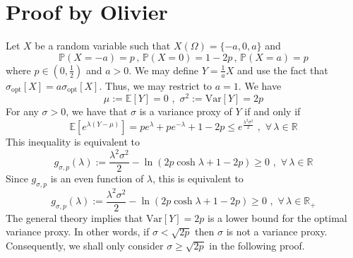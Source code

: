 \documentclass[a4paper, 10pt]{article}
\renewcommand{\P}{\mathbb{P}}
\newcommand{\E}{\mathbb{E}}
\newcommand{\beq}{\begin{equation}}
\newcommand{\eeq}{\end{equation}}
\theoremstyle{definition}
\begin{document}
\section{Proof by Olivier}
Let $X$ be a random variable such that $X(\Omega)=\{-a,0,a\}$ and 
\begin{equation}
    \P(X=-a)=p\,,\, \P(X=0)=1-2p\,,\, \P(X=a)=p
\end{equation}
where $p\in \left( 0,\frac{1}{2}\right)$ and $a>0$. We may define $Y=\frac{1}{a}X$ and use the fact that $\sigma_{\text{opt}}[X]=a \sigma_{\text{opt}}[X]$. Thus, we may restrict to $a=1$. We have
\beq \mu:=\E[Y]=0\,\,,\,\, \sigma^2:=\text{Var}[Y]=2p\eeq
For any $\sigma>0$, we have that $\sigma$ is a variance proxy of $Y$ if and only if
\beq \E\left[e^{\lambda (Y-\mu)}\right]=p e^{\lambda }+ pe^{-\lambda } +1-2p\leq e^{\frac{\lambda^2\sigma^2}{2}} \,\, ,\,\, \forall \, \lambda\in \mathbb{R}\eeq
This inequality is equivalent to
\beq g_{\sigma,p}(\lambda):=\frac{\lambda^2\sigma^2}{2}-\ln( 2p\cosh \lambda +1-2p)\geq 0 \,\,,\,\,  \forall \, \lambda\in \mathbb{R}\eeq
Since $g_{\sigma,p}$ is an even function of $\lambda$, this is equivalent to 
\beq g_{\sigma,p}(\lambda):=\frac{\lambda^2\sigma^2}{2}-\ln( 2p\cosh \lambda +1-2p)\geq 0 \,\,,\,\,  \forall \, \lambda\in \mathbb{R}_+\eeq
The general theory implies that $\text{Var}[Y]=2p$ is a lower bound for the optimal variance proxy. In other words, if $\sigma<\sqrt{2p}$ then $\sigma$ is not a variance proxy. Consequently, we shall only consider $\sigma\geq \sqrt{2p}$ in the following proof.
\medskip
\end{document}
